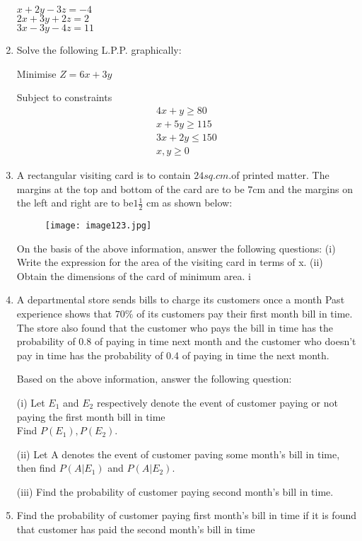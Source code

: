 \documentclass{article}
\begin{document}
\begin{enumerate}
$x +2y-3z=-4$\\
$2x+3y+2z=2$\\
$3x-3y-4z=11$

\item Solve the following L.P.P. graphically:

Minimise $Z = 6x + 3y$

Subject to constraints
\begin{align*}
 4x+y\geq80\\
 x+5y\geq115\\
 3x+2y\leq150\\
x,y\geq0
\end{align*}
\item A rectangular visiting card is to contain $24 sq.cm. $of printed matter. The margins at the top and bottom of the card are to be $7\mathrm{cm}$ and the margins on the left and right are to be$1\frac{1}{2}$ cm as shown below:
\newpage
\begin{figure}[h!]
\centering
\texttt{[image: image123.jpg]}
\label{fig:image123}
\end{figure}

On the basis of the above information, answer the following questions:
(i) Write the expression for the area of the visiting card in terms of x.
(ii) Obtain the dimensions of the card of minimum area.
i\item A departmental store sends bills to charge its customers once a month Past experience shows that $ 70\% $ of its customers pay their first month bill in time. The store also found that the customer who pays the bill in time has the probability of 0.8 of paying in time next month and the customer who doesn't pay in time has the probability of 0.4 of paying in time the next month.

Based on the above information, answer the following question:

(i) Let  $E_1$ and $E_2$ respectively denote the event of customer paying or not paying the first month bill in time\\
Find $P(E_1),P(E_2).$

(ii) Let A denotes the event of customer paving some month's bill in time, then find $P(A|E_1)$ and $P(A|E_2).$

(iii) Find the probability of customer paying second month's bill in time.

\item Find the probability of customer paying first month's bill in time if it is found that customer has paid the second month's bill in time


\end{enumerate}
\end{document}
